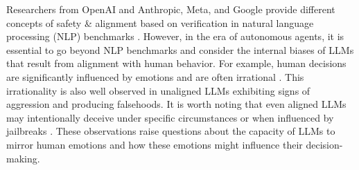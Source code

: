 \documentclass{article}
\begin{document}


Researchers from OpenAI and Anthropic, Meta, and Google provide different concepts of safety \& alignment based on verification in natural language processing (NLP) benchmarks \cite{durmus2023towards}. However, in the era of autonomous agents, it is essential to go beyond NLP benchmarks and consider the internal biases of LLMs that result from alignment with human behavior. For example, human decisions are significantly influenced by emotions and are often irrational \cite{damasio2001descartes, lerner2015emotion, zeelenberg2008emotion, rolls2014emotion, lakomski2010passionate, volz2016emotions, pham2007emotion}. This irrationality is also well observed in unaligned LLMs exhibiting signs of aggression \cite{hadshar2023review} and producing falsehoods. It is worth noting that even aligned LLMs may intentionally deceive under specific circumstances \cite{kim2023generative, scheurer2024large} or when influenced by jailbreaks \cite{zhao2024weak}. These observations raise questions about the capacity of LLMs to mirror human emotions and how these emotions might influence their decision-making.




\end{document}

